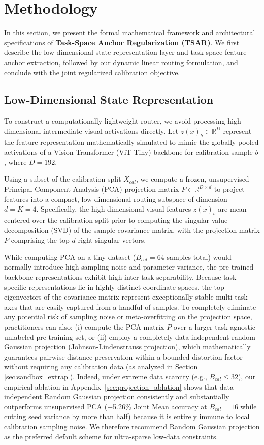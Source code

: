 \section{Methodology}
\label{sec:method}

In this section, we present the formal mathematical framework and architectural specifications of
\textbf{Task-Space Anchor Regularization (TSAR)}. We first describe the low-dimensional state
representation layer and task-space feature anchor extraction, followed by our dynamic linear
routing formulation, and conclude with the joint regularized calibration objective.

\subsection{Low-Dimensional State Representation}
To construct a computationally lightweight router, we avoid processing high-dimensional
intermediate visual activations directly. Let $z(x)_b \in \mathbb{R}^D$ represent the feature
representation mathematically simulated to mimic the globally pooled activations of a Vision
Transformer (ViT-Tiny) backbone for calibration sample $b$, where $D=192$. 

Using a subset of the calibration split $X_{cal}$, we compute a frozen, unsupervised Principal
Component Analysis (PCA) projection matrix $P \in \mathbb{R}^{D \times d}$ to project features into
a compact, low-dimensional routing subspace of dimension $d = K = 4$. Specifically, the
high-dimensional visual features $z(x)_b$ are mean-centered over the calibration split prior to
computing the singular value decomposition (SVD) of the sample covariance matrix, with the
projection matrix $P$ comprising the top $d$ right-singular vectors. 

While computing PCA on a tiny dataset ($B_{cal} = 64$ samples total) would normally introduce high
sampling noise and parameter variance, the pre-trained backbone representations exhibit high
inter-task separability. Because task-specific representations lie in highly distinct coordinate
spaces, the top eigenvectors of the covariance matrix represent exceptionally stable multi-task axes
that are easily captured from a handful of samples. To completely eliminate any potential risk of
sampling noise or meta-overfitting on the projection space, practitioners can also: (i) compute the
PCA matrix $P$ over a larger task-agnostic unlabeled pre-training set, or (ii) employ a completely
data-independent random Gaussian projection (Johnson-Lindenstrauss projection), which mathematically
guarantees pairwise distance preservation within a bounded distortion factor without requiring any
calibration data (as analyzed in Section \ref{sec:sandbox_extrap}). Indeed, under extreme data
scarcity (e.g., $B_{cal} \le 32$), our empirical ablation in Appendix~\ref{sec:projection_ablation}
shows that data-independent Random Gaussian projection consistently and substantially outperforms
unsupervised PCA (+5.26\% Joint Mean accuracy at $B_{cal}=16$ while cutting seed variance by more
than half) because it is entirely immune to local calibration sampling noise. We therefore recommend
Random Gaussian projection as the preferred default scheme for ultra-sparse low-data constraints.

